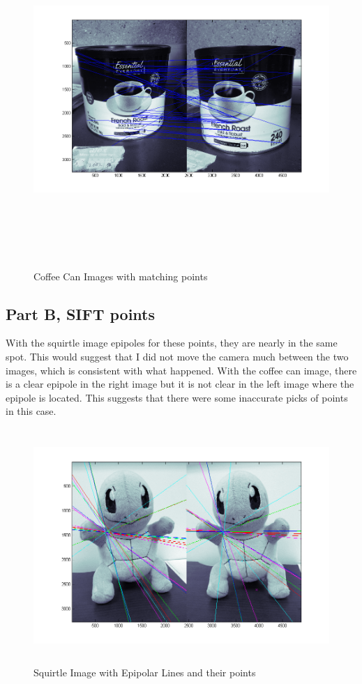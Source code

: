 \documentclass[11pt,psfig]{article}
\begin{document}
\begin{figure}[H]
\centering
\includegraphics[height=5in]{coffeeCan_prob2Matches2.png}
\caption{Coffee Can Images with matching points}
\label{p2f}
\end{figure}

\newpage

\subsection*{Part B, SIFT points}

With the squirtle image epipoles for these points, they are nearly in the same spot. This would suggest that I did not move the camera much between the two images, which is consistent with what happened. With the coffee can image, there is a clear epipole in the right image but it is not clear in the left image where the epipole is located. This suggests that there were some inaccurate picks of points in this case.

\begin{figure}[H]
\centering
\includegraphics[height=3.5in]{squirtle_prob2Epipolar2.png}
\caption{Squirtle Image with Epipolar Lines and their points}
\label{p2g}
\end{figure}
\end{document}
